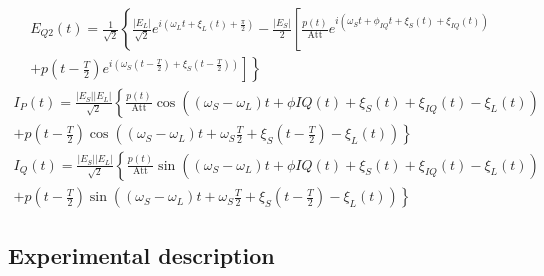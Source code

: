 \begin{multline}\label{eq:18}
E_{Q2}(t)=\frac{1}{\sqrt{2}}\left\lbrace\frac{|E_L|}{\sqrt{2}}e^{i\left(\omega_Lt+\xi_L(t)+\frac{\pi}{2}\right)}-\frac{|E_S|}{2}\left[\frac{p(t)}{\text{Att}}e^{i(\omega_St+\phi_{IQ}t+\xi_S(t)+\xi_{IQ}(t))}\right.\right.\\
\left.\left.+p\left(t-\frac{T}{2}\right)e^{i\left(\omega_S\left(t-\frac{T}{2}\right)+\xi_S\left(t-\frac{T}{2}\right)\right)}\right]\right\rbrace
\end{multline}
\begin{multline}\label{eq:19}
I_P(t)=\frac{|E_S||E_L|}{\sqrt{2}}\left\lbrace\frac{p(t)}{\text{Att}}\cos((\omega_S-\omega_L)t+\phi{IQ}(t)+\xi_S(t)+\xi_{IQ}(t)-\xi_L(t))\right.\\
\left.+p\left(t-\frac{T}{2}\right)\cos\left((\omega_S-\omega_L)t+\omega_S\frac{T}{2}+\xi_S\left(t-\frac{T}{2}\right)-\xi_L(t)\right)\right\rbrace
\end{multline}
\begin{multline}\label{eq:20}
I_Q(t)=\frac{|E_S||E_L|}{\sqrt{2}}\left\lbrace\frac{p(t)}{\text{Att}}\sin((\omega_S-\omega_L)t+\phi{IQ}(t)+\xi_S(t)+\xi_{IQ}(t)-\xi_L(t))\right.\\
\left.+p\left(t-\frac{T}{2}\right)\sin\left((\omega_S-\omega_L)t+\omega_S\frac{T}{2}+\xi_S\left(t-\frac{T}{2}\right)-\xi_L(t)\right)\right\rbrace
\end{multline}

\subsection*{Experimental description}

